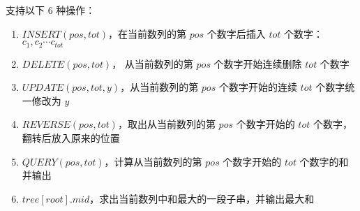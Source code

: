\documentclass[E:/GsjzTle/main/main.tex]{subfiles}
\begin{document}
支持以下 \(6\) 种操作：

\begin{enumerate}
\def\labelenumi{\arabic{enumi}.}
\item
  \(INSERT(pos , tot)\)，在当前数列的第 \(pos\) 个数字后插入 \(tot\)
  个数字：\(c_1, c_2 \cdots c_{tot}\)
\item
  \(DELETE(pos , tot)\)， 从当前数列的第 \(pos\) 个数字开始连续删除
  \(tot\) 个数字
\item
  \(UPDATE(pos,tot,y)\)，从当前数列的第 \(pos\) 个数字开始的连续 \(tot\)
  个数字统一修改为 \(y\)
\item
  \(REVERSE(pos,tot)\)，取出从当前数列的第 \(pos\) 个数字开始的 \(tot\)
  个数字，翻转后放入原来的位置
\item
  \(QUERY(pos,tot)\)，计算从当前数列的第 \(pos\) 个数字开始的 \(tot\)
  个数字的和并输出
\item
  \(tree[root].mid\)，求出当前数列中和最大的一段子串，并输出最大和
\end{enumerate}
\end{document}
